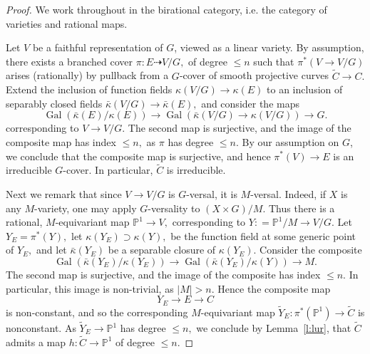 \documentclass[10pt,a4paper]{amsart}
\DeclareMathOperator{\Gal}{Gal}
\newcommand{\Pb}{\mathbb{P}}
\newcommand{\tC}{\widetilde{C}}
\begin{document}
\begin{proof}  We work throughout in the birational category, i.e. the category of varieties and rational maps.  

Let $V$ be a faithful representation of $G$, viewed as a linear variety. 
By assumption, there exists a branched cover $\pi\colon E\dashrightarrow V/G,$ of degree $\leq n$ 
such that $\pi^*(V \rightarrow V/G)$ arises (rationally) by pullback from a $G$-cover of smooth projective curves  
$\tilde C \rightarrow C.$
Extend the inclusion of function fields $\kappa(V/G) \rightarrow \kappa(E)$ to an inclusion of separably closed fields 
$\bar \kappa(V/G) \rightarrow \bar \kappa(E),$ and consider the maps 
$$ \Gal(\bar \kappa(E)/ \kappa(E)) \rightarrow \Gal(\bar\kappa(V/G) \rightarrow \kappa(V/G)) \rightarrow G.$$ 
corresponding to $V \rightarrow V/G.$ The second map is surjective, and the image of the composite map 
has index $\leq n,$ as $\pi$ has degree $\leq n.$ By our assumption on $G$, we conclude that the composite map is surjective, and hence $\pi^*(V) \rightarrow E$ 
is an irreducible $G$-cover. In particular, $\tilde C$ is irreducible.

Next we remark that since $V \rightarrow V/G$ is $G$-versal, it is $M$-versal. 
Indeed, if $X$ is any $M$-variety, one may apply $G$-versality to $(X \times G)/M.$ 
Thus there is a rational, $M$-equivariant map $\Pb^1 \rightarrow V,$ corresponding to 
$Y: = \Pb^1/M \rightarrow V/G.$ Let $Y_E = \pi^*(Y),$ 
let $\kappa(Y_E) \supset \kappa(Y),$ be the function field at some generic point of $Y_E,$ 
and let $\bar \kappa(Y_E)$ be a separable closure of $\kappa(Y_E).$ Consider the composite 
$$ \Gal(\bar \kappa(Y_E)/ \kappa(Y_E)) \rightarrow \Gal(\bar \kappa(Y_E)/ \kappa(Y)) \rightarrow M.$$ 
The second map is surjective, and the image of the composite has index $\leq n.$ In particular, this image is 
non-trivial, as $|M| > n.$ Hence the composite map 
$$ Y_E \rightarrow E \rightarrow C $$
is non-constant, and so the corresponding $M$-equivariant map $\tilde Y_E : \pi^*(\Pb^1) \rightarrow \tilde C$ 
is nonconstant. As $\tilde Y_E \rightarrow \Pb^1$ has degree $\leq n,$ 
we conclude by Lemma~\ref{l:lur}, that $\tC$ admits a map $h\colon \tC\to\Pb^1$ of degree $\le n$.
	\end{proof}
\end{document}
